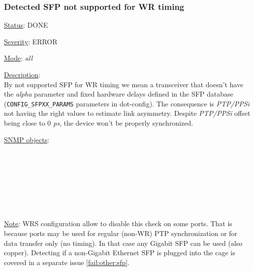 \subsubsection{\bf Detected SFP not supported for WR timing}
		\label{fail:timing:wrong_sfp}
		\begin{packed_enum}
			\item [] \underline{Status}: DONE
			\item [] \underline{Severity}: ERROR
			\item [] \underline{Mode}: \emph{all}
			\item [] \underline{Description}:\\
				By not supported SFP for WR timing we mean a transceiver that doesn't
				have the \emph{alpha} parameter and fixed hardware delays defined in the
				SFP database (\texttt{CONFIG\_SFPXX\_PARAMS} parameters in dot-config). The consequence is
				\emph{PTP/PPSi} not having the right values to estimate link asymmetry.
				Despite \emph{PTP/PPSi} offset being close to 0 \emph{ps}, the device won't
				be properly synchronized.
			\item [] \underline{SNMP objects}:\\
				\\
				\\
				\\
				\\
				\\
				\\
				\\
			\item [] \underline{Note}: WRS configuration allow to disable this check on some ports.
				That is because ports may be used for regular (non-WR) PTP
				synchronization or for data transfer only (no timing). In that case any
				Gigabit SFP can be used (also copper). Detecting if a non-Gigabit
				Ethernet SFP is plugged into the cage is covered in a separate issue
				\ref{fail:other:sfp}.
		\end{packed_enum}

